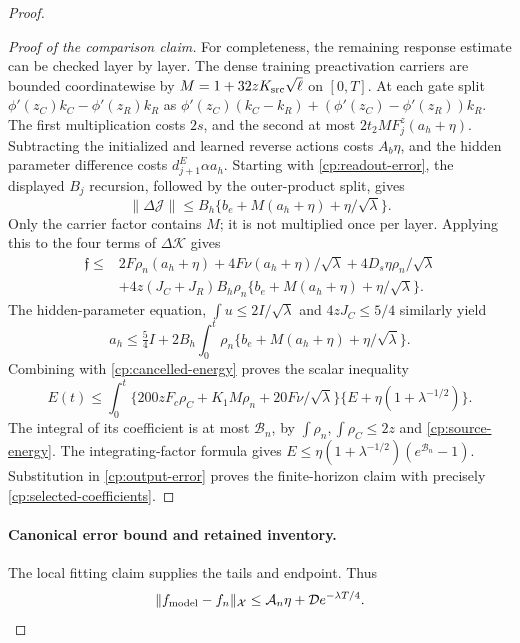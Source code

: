 \begin{proof}
\begin{proof}[Proof of the comparison claim]
For completeness, the remaining response estimate can be checked
layer by layer. The dense training preactivation carriers are bounded
coordinatewise by
$M=1+32zK_{\rm src}\sqrt\ell$ on $[0,T]$.
At each gate split
$\phi'(z_C)k_C-\phi'(z_R)k_R$
as $\phi'(z_C)(k_C-k_R)+(\phi'(z_C)-\phi'(z_R))k_R$.
The first multiplication costs $2s$, and the second at most
$2t_2MF_j^z(a_h+\eta)$. Subtracting the initialized and learned reverse
actions costs $A_b\eta$, and the hidden parameter difference costs
$d_{j+1}^E\alpha a_h$. Starting with \eqref{cp:readout-error}, the
displayed $B_j$ recursion, followed by the outer-product split, gives
\[
 \|\Delta\mathcal J\|
 \le B_h\{b_e+M(a_h+\eta)+\eta/\sqrt\lambda\}.
\]
Only the carrier factor contains $M$; it is not multiplied once per
layer. Applying this to the four terms of $\Delta\mathcal K$ gives
\begin{align*}
 \mathfrak f\le{}&2F\rho_n(a_h+\eta)
       +4F\nu(a_h+\eta)/\sqrt\lambda+4D_s\eta\rho_n/\sqrt\lambda\\
 &+4z(J_C+J_R)B_h\rho_n
                  \{b_e+M(a_h+\eta)+\eta/\sqrt\lambda\}.
\end{align*}
The hidden-parameter equation, $\int u\le2I/\sqrt\lambda$ and
$4zJ_C\le5/4$ similarly yield
\[
 a_h\le\tfrac54 I+2B_h\int_0^t\rho_n
                    \{b_e+M(a_h+\eta)+\eta/\sqrt\lambda\}.
\]
Combining with \eqref{cp:cancelled-energy} proves the scalar inequality
\[
 E(t)\le\int_0^t
 \{200zF_c\rho_C+K_1M\rho_n+20F\nu/\sqrt\lambda\}
                \{E+\eta(1+\lambda^{-1/2})\}.
\]
The integral of its coefficient is at most $\mathcal B_n$, by
$\int\rho_n,\int\rho_C\le2z$ and \eqref{cp:source-energy}.
The integrating-factor formula gives
$E\le\eta(1+\lambda^{-1/2})(e^{\mathcal B_n}-1)$.
Substitution in \eqref{cp:output-error} proves the finite-horizon
claim with precisely \eqref{cp:selected-coefficients}.
\end{proof}

\paragraph{Canonical error bound and retained inventory.}
The local fitting claim supplies the tails and endpoint. Thus
\[
 \|f_{\rm model}-f_n\|_{\mathcal X}\le
             \mathcal A_n\eta+\mathcal D e^{-\lambda T/4}.
\]


\end{proof}
